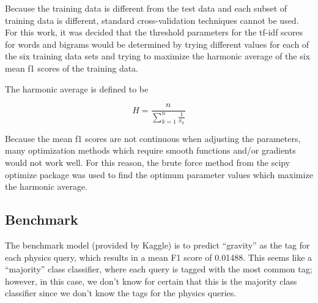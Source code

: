 \documentclass{article}
\def\eqstart{\begin{equation}}
\def\eqend{\end{equation}}
\begin{document}
Because the training data is different from the test data and each subset of
training data is different, standard cross-validation techniques cannot be
used. For this work, it was decided that the threshold parameters for the
tf-idf scores for words and bigrams would be determined by trying different
values for each of the six training data sets and trying to maximize the
harmonic average of the six mean f1 scores of the training data.

The harmonic average is defined to be

\eqstart
H = \frac{n}{\sum_{k=1}^{n} \frac{1}{x_k}}
\eqend

Because the mean f1 scores are not continuous when adjusting the parameters,
many optimization methods which require smooth functions and/or gradients
would not work well. For this reason, the brute force method from the scipy
optimize package was used to find the optimum parameter values which maximize
the harmonic average.




\subsection{Benchmark}

The benchmark model (provided by Kaggle) is to predict ``gravity'' as the tag
for each physics query, which results in a mean F1 score of 0.01488.  This
seems like a ``majority'' class classifier, where each query is tagged with
the most common tag; however, in this case, we don't know for certain that
this is the majority class classifier since we don't know the tags for the
physics queries. 

\end{document}
